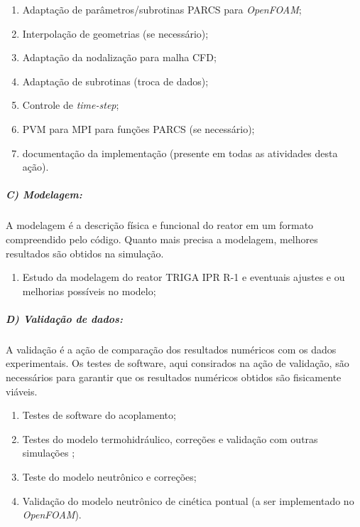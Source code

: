 \documentclass[12pt,openright,twoside,a4paper,english,french,spanish,brazil]{abntex2}
\begin{document}
\begin{enumerate}
\item Adaptação de parâmetros/subrotinas PARCS para \textit{OpenFOAM};
\item Interpolação de geometrias (se necessário);
\item Adaptação da nodalização para malha CFD;
\item Adaptação de subrotinas (troca de dados);
\item Controle de \textit{time-step};
\item PVM para MPI para funções PARCS (se necessário);
\item documentação da implementação (presente em todas as atividades desta ação).
\end{enumerate}

\subparagraph{C) Modelagem:}

A modelagem é a descrição física e funcional do reator em um formato 
compreendido pelo código. Quanto mais precisa a modelagem, melhores 
resultados são obtidos na simulação.
\begin{enumerate}
\item Estudo da modelagem do reator TRIGA IPR R-1 \cite{Reis2013} e eventuais ajustes 
e ou melhorias possíveis no modelo;
\end{enumerate}

\subparagraph{D) Validação de dados:}

A validação é a ação de comparação dos resultados numéricos com os dados 
experimentais. Os testes de software, aqui consirados na ação de validação, 
são necessários para garantir que os resultados numéricos obtidos são 
fisicamente viáveis. 

\begin{enumerate}
\item Testes de software do acoplamento; 
\item Testes do modelo termohidráulico, correções e validação com outras simulações \cite{Reis2009} ;
\item Teste do modelo neutrônico e correções;
\item Validação do modelo neutrônico de cinética pontual (a ser implementado no \textit{OpenFOAM}).
\end{enumerate}
\end{document}
